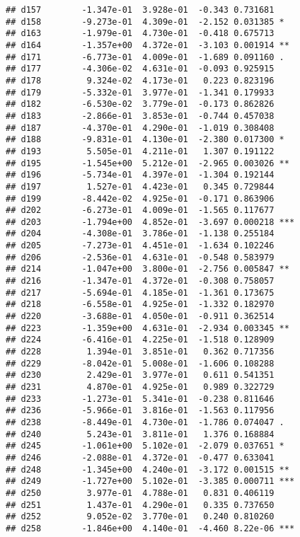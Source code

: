 \documentclass[
]{article}
\begin{document}
\begin{verbatim}
## d157        -1.347e-01  3.928e-01  -0.343 0.731681    
## d158        -9.273e-01  4.309e-01  -2.152 0.031385 *  
## d163        -1.979e-01  4.730e-01  -0.418 0.675713    
## d164        -1.357e+00  4.372e-01  -3.103 0.001914 ** 
## d171        -6.773e-01  4.009e-01  -1.689 0.091160 .  
## d177        -4.306e-02  4.631e-01  -0.093 0.925915    
## d178         9.324e-02  4.173e-01   0.223 0.823196    
## d179        -5.332e-01  3.977e-01  -1.341 0.179933    
## d182        -6.530e-02  3.779e-01  -0.173 0.862826    
## d183        -2.866e-01  3.853e-01  -0.744 0.457038    
## d187        -4.370e-01  4.290e-01  -1.019 0.308408    
## d188        -9.831e-01  4.130e-01  -2.380 0.017300 *  
## d193         5.505e-01  4.211e-01   1.307 0.191122    
## d195        -1.545e+00  5.212e-01  -2.965 0.003026 ** 
## d196        -5.734e-01  4.397e-01  -1.304 0.192144    
## d197         1.527e-01  4.423e-01   0.345 0.729844    
## d199        -8.442e-02  4.925e-01  -0.171 0.863906    
## d202        -6.273e-01  4.009e-01  -1.565 0.117677    
## d203        -1.794e+00  4.852e-01  -3.697 0.000218 ***
## d204        -4.308e-01  3.786e-01  -1.138 0.255184    
## d205        -7.273e-01  4.451e-01  -1.634 0.102246    
## d206        -2.536e-01  4.631e-01  -0.548 0.583979    
## d214        -1.047e+00  3.800e-01  -2.756 0.005847 ** 
## d216        -1.347e-01  4.372e-01  -0.308 0.758057    
## d217        -5.694e-01  4.185e-01  -1.361 0.173675    
## d218        -6.558e-01  4.925e-01  -1.332 0.182970    
## d220        -3.688e-01  4.050e-01  -0.911 0.362514    
## d223        -1.359e+00  4.631e-01  -2.934 0.003345 ** 
## d224        -6.416e-01  4.225e-01  -1.518 0.128909    
## d228         1.394e-01  3.851e-01   0.362 0.717356    
## d229        -8.042e-01  5.008e-01  -1.606 0.108288    
## d230         2.429e-01  3.977e-01   0.611 0.541351    
## d231         4.870e-01  4.925e-01   0.989 0.322729    
## d233        -1.273e-01  5.341e-01  -0.238 0.811646    
## d236        -5.966e-01  3.816e-01  -1.563 0.117956    
## d238        -8.449e-01  4.730e-01  -1.786 0.074047 .  
## d240         5.243e-01  3.811e-01   1.376 0.168884    
## d245        -1.061e+00  5.102e-01  -2.079 0.037651 *  
## d246        -2.088e-01  4.372e-01  -0.477 0.633041    
## d248        -1.345e+00  4.240e-01  -3.172 0.001515 ** 
## d249        -1.727e+00  5.102e-01  -3.385 0.000711 ***
## d250         3.977e-01  4.788e-01   0.831 0.406119    
## d251         1.437e-01  4.290e-01   0.335 0.737650    
## d252         9.052e-02  3.770e-01   0.240 0.810260    
## d258        -1.846e+00  4.140e-01  -4.460 8.22e-06 ***

\end{verbatim}
\end{document}
